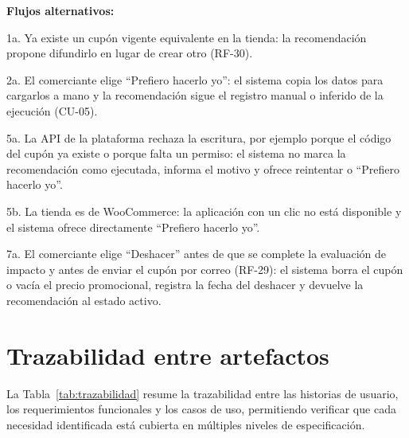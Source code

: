 \noindent\textbf{Flujos alternativos:}

\noindent 1a. Ya existe un cupón vigente equivalente en la tienda: la recomendación propone difundirlo en lugar de crear otro (RF-30).

\noindent 2a. El comerciante elige \enquote{Prefiero hacerlo yo}: el sistema copia los datos para cargarlos a mano y la recomendación sigue el registro manual o inferido de la ejecución (CU-05).

\noindent 5a. La API de la plataforma rechaza la escritura, por ejemplo porque el código del cupón ya existe o porque falta un permiso: el sistema no marca la recomendación como ejecutada, informa el motivo y ofrece reintentar o \enquote{Prefiero hacerlo yo}.

\noindent 5b. La tienda es de WooCommerce: la aplicación con un clic no está disponible y el sistema ofrece directamente \enquote{Prefiero hacerlo yo}.

\noindent 7a. El comerciante elige \enquote{Deshacer} antes de que se complete la evaluación de impacto y antes de enviar el cupón por correo (RF-29): el sistema borra el cupón o vacía el precio promocional, registra la fecha del deshacer y devuelve la recomendación al estado activo.

\section{Trazabilidad entre artefactos}
\label{sec:trazabilidad-artefactos}

La Tabla~\ref{tab:trazabilidad} resume la trazabilidad entre las historias de usuario, los requerimientos funcionales y los casos de uso, permitiendo verificar que cada necesidad identificada está cubierta en múltiples niveles de especificación.


